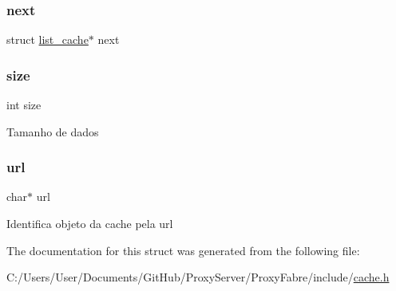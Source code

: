 \mbox{\label{structlist__cache_aceefb1f57729a8a9a02a627d55effcc7}} 
\subsubsection{\texorpdfstring{next}{next}}
{\footnotesize\ttfamily struct \hyperlink{structlist__cache}{list\+\_\+cache}$\ast$ next}

\mbox{\label{structlist__cache_a439227feff9d7f55384e8780cfc2eb82}} 
\subsubsection{\texorpdfstring{size}{size}}
{\footnotesize\ttfamily int size}

Tamanho de dados \mbox{\label{structlist__cache_ab135e5154c1828bef226a3df98ee3333}} 
\subsubsection{\texorpdfstring{url}{url}}
{\footnotesize\ttfamily char$\ast$ url}

Identifica objeto da cache pela url 

The documentation for this struct was generated from the following file\+:\begin{DoxyCompactItemize}
\item 
C\+:/\+Users/\+User/\+Documents/\+Git\+Hub/\+Proxy\+Server/\+Proxy\+Fabre/include/\hyperlink{cache_8h}{cache.\+h}\end{DoxyCompactItemize}
